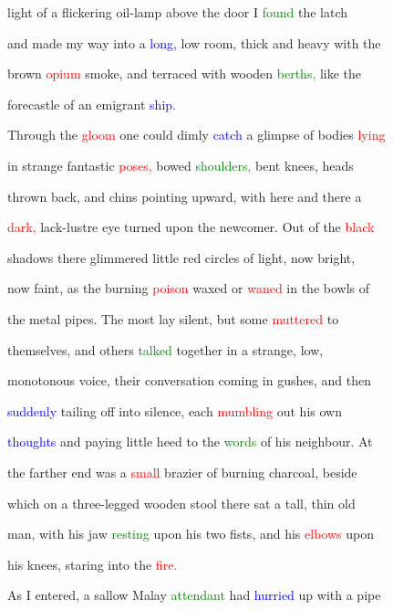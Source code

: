 light of a flickering oil-lamp above the door I \textcolor{green}{found} the latch

 and made my way into a \textcolor{blue}{long,} low room, thick and heavy with the

 brown \textcolor{red}{opium} smoke, and terraced with wooden \textcolor{green}{berths,} like the

 forecastle of an emigrant \textcolor{blue}{ship.}



 Through the \textcolor{red}{gloom} one could dimly \textcolor{blue}{catch} a glimpse of bodies \textcolor{red}{lying}

 in strange fantastic \textcolor{red}{poses,} bowed \textcolor{green}{shoulders,} bent knees, heads

 thrown back, and chins pointing upward, with here and there a

 \textcolor{red}{dark,} lack-lustre eye turned upon the \textcolor{BurntOrange}{newcomer.} Out of the \textcolor{red}{black}

 shadows there \textcolor{BurntOrange}{glimmered} little red circles of light, now bright,

 now faint, as the burning \textcolor{red}{poison} waxed or \textcolor{red}{waned} in the bowls of

 the metal pipes. The most lay silent, but some \textcolor{red}{muttered} to

 themselves, and others \textcolor{green}{talked} together in a strange, low,

 monotonous voice, their conversation coming in \textcolor{BurntOrange}{gushes,} and then

 \textcolor{blue}{suddenly} tailing off into silence, each \textcolor{red}{mumbling} out his own

 \textcolor{blue}{thoughts} and \textcolor{BurntOrange}{paying} little heed to the \textcolor{green}{words} of his neighbour. At

 the farther end was a \textcolor{red}{small} brazier of burning charcoal, beside

 which on a three-legged wooden stool there sat a tall, thin old

 man, with his jaw \textcolor{green}{resting} upon his two fists, and his \textcolor{red}{elbows} upon

 his knees, \textcolor{BurntOrange}{staring} into the \textcolor{red}{fire.}



 As I entered, a sallow Malay \textcolor{green}{attendant} had \textcolor{blue}{hurried} up with a pipe

